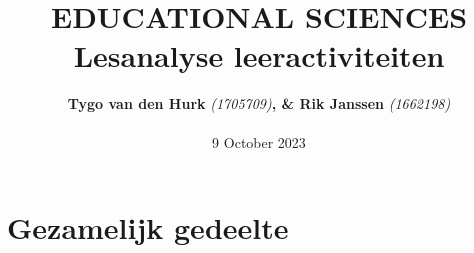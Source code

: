 \documentclass{article}
\begin{document}
    \title{ 
        \normalsize 
        \textsc{} \\
        [2.0cm]
        \HRule{1.5pt} \\
        \LARGE \textbf{
            \uppercase{
             Educational sciences}
        \HRule{2.0pt} \\ 
        [0.6cm] 
        \LARGE{
            Lesanalyse leeractiviteiten} 
        \vspace*{
            10\baselineskip}}}
    \date{}
    \author{
        \textbf{Tygo van den Hurk} \textit{(1705709)}\textbf{, \& Rik Janssen} 
        \textit{(1662198)} \\ 
        \\
        9 October 2023}
    \maketitle
    \newpage
    \tableofcontents
    \newpage
    \section{Gezamelijk gedeelte}
\end{document}
